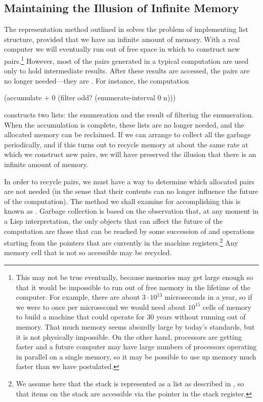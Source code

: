 \subsection{Maintaining the Illusion of Infinite Memory}
\label{Section 5.3.2}

The representation method outlined in  solves the problem of
implementing list structure, provided that we have an infinite amount of
memory.  With a real computer we will eventually run out of free space in which
to construct new pairs.\footnote{This may not be true eventually, because
memories may get large enough so that it would be impossible to run out of free
memory in the lifetime of the computer.  For example, there are about
\( 3\cdot10^{13} \) microseconds in a year, so if we were to  once per
microsecond we would need about \( 10^{15} \) cells of memory to build a machine that
could operate for 30 years without running out of memory.  That much memory
seems absurdly large by today's standards, but it is not physically impossible.
On the other hand, processors are getting faster and a future computer may have
large numbers of processors operating in parallel on a single memory, so it may
be possible to use up memory much faster than we have postulated.}  However,
most of the pairs generated in a typical computation are used only to hold
intermediate results.  After these results are accessed, the pairs are no
longer needed---they are .  For instance, the computation

\begin{codeBlock}
(accumulate + 0 (filter odd? (enumerate-interval 0 n)))
\end{codeBlock}

\noindent
constructs two lists: the enumeration and the result of filtering the
enumeration.  When the accumulation is complete, these lists are no longer
needed, and the allocated memory can be reclaimed.  If we can arrange to
collect all the garbage periodically, and if this turns out to recycle memory
at about the same rate at which we construct new pairs, we will have preserved
the illusion that there is an infinite amount of memory.

In order to recycle pairs, we must have a way to determine which allocated
pairs are not needed (in the sense that their contents can no longer influence
the future of the computation).  The method we shall examine for accomplishing
this is known as .  Garbage collection is based on
the observation that, at any moment in a Lisp interpretation, the only objects
that can affect the future of the computation are those that can be reached by
some succession of  and  operations starting from the
pointers that are currently in the machine registers.\footnote{We assume here
that the stack is represented as a list as described in , so
that items on the stack are accessible via the pointer in the stack register.}
Any memory cell that is not so accessible may be recycled.


